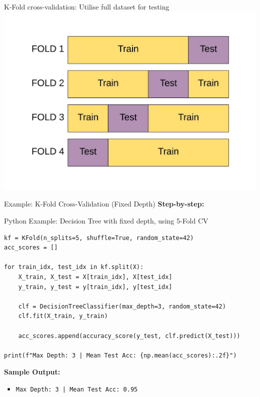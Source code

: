 \documentclass{beamer}
\begin{document}
	\begin{frame}{K-Fold cross-validation: Utilise full dataset for testing}
	\includegraphics[width = \textwidth]{../assets/bias-variance/diagrams/cross-validation-train-test.pdf}
	\end{frame}

\begin{frame}[fragile]{Example: K-Fold Cross-Validation (Fixed Depth)}
\textbf{Step-by-step:}

\begin{block}{Python Example: Decision Tree with fixed depth, using 5-Fold CV}
\scriptsize
\begin{verbatim}
kf = KFold(n_splits=5, shuffle=True, random_state=42)
acc_scores = []

for train_idx, test_idx in kf.split(X):
    X_train, X_test = X[train_idx], X[test_idx]
    y_train, y_test = y[train_idx], y[test_idx]
    
    clf = DecisionTreeClassifier(max_depth=3, random_state=42)
    clf.fit(X_train, y_train)
    
    acc_scores.append(accuracy_score(y_test, clf.predict(X_test)))

print(f"Max Depth: 3 | Mean Test Acc: {np.mean(acc_scores):.2f}")
\end{verbatim}
\end{block}

\textbf{Sample Output:}
\begin{itemize}
    \item \texttt{Max Depth: 3 | Mean Test Acc: 0.95}
\end{itemize}
\end{frame}
\end{document}

